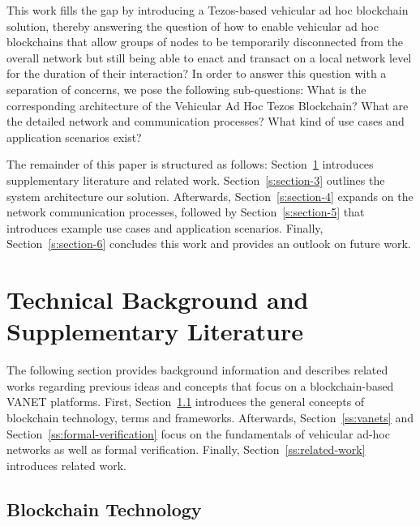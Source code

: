 \documentclass{llncs}
\begin{document}
{%
		
		This work fills the gap by introducing a Tezos-based vehicular ad hoc blockchain solution, thereby answering the question of how to enable vehicular ad hoc blockchains that allow groups of nodes to be temporarily disconnected from the overall network but still being able to enact and transact on a local network level for the duration of their interaction? In order to answer this question with a separation of concerns, we pose the following sub-questions: What is the corresponding architecture of the Vehicular Ad Hoc Tezos Blockchain? What are the detailed network and communication processes? What kind of use cases and application scenarios exist?
		
		The remainder of this paper is structured as follows: Section~\ref{s:section-2} introduces supplementary literature and related work. Section~\ref{s:section-3} outlines the system architecture our solution. Afterwards, Section~\ref{s:section-4} expands on the network communication processes, followed by Section~\ref{s:section-5} that introduces example use cases and application scenarios. Finally, Section~\ref{s:section-6} concludes this work and provides an outlook on future work.



	\section{Technical Background and Supplementary Literature}	
		\label{s:section-2}
		
		The following section provides background information and describes related works regarding previous ideas and concepts that focus on a blockchain-based VANET platforms. First, Section~\ref{ss:blockchain-intro} introduces the general concepts of blockchain technology, terms and frameworks. Afterwards, Section~\ref{ss:vanets} and Section~\ref{ss:formal-verification} focus on the fundamentals of vehicular ad-hoc networks as well as formal verification. Finally, Section~\ref{ss:related-work} introduces related work. 
					
		
		\subsection{Blockchain Technology}
			\label{ss:blockchain-intro}
			
}
\end{document}
